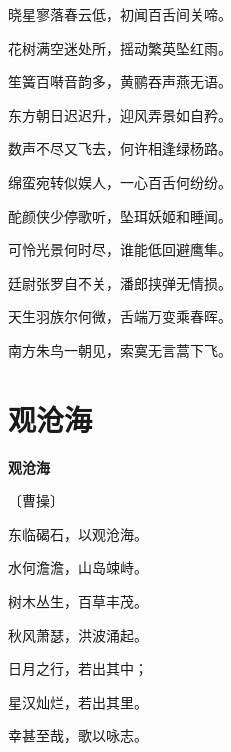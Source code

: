 \documentclass[12pt,UTF-8,openany,fontset=none]{ctexbook}
\begin{document}
\begin{center}
    \begin{Large}

        晓星寥落春云低，初闻百舌间关啼。

        花树满空迷处所，摇动繁英坠红雨。

        笙簧百啭音韵多，黄鹂吞声燕无语。

        东方朝日迟迟升，迎风弄景如自矜。

        数声不尽又飞去，何许相逢绿杨路。

        绵蛮宛转似娱人，一心百舌何纷纷。

        酡颜侠少停歌听，坠珥妖姬和睡闻。

        可怜光景何时尽，谁能低回避鹰隼。

        廷尉张罗自不关，潘郎挟弹无情损。

        天生羽族尔何微，舌端万变乘春晖。

        南方朱鸟一朝见，索寞无言蒿下飞。

    \end{Large}

\end{center}

\vspace{8pt}
\clearpage

\section{观沧海}


\begin{center}
    {\bfseries 观沧海}

    \vspace{18pt}

    \begin{large}\xuwen
        〔曹操〕
    \end{large}

\end{center}

    \vspace{18pt}  %

\begin{center}
    \begin{Large}

        东临碣石，以观沧海。

        水何澹澹，山岛竦峙。

        树木丛生，百草丰茂。

        秋风萧瑟，洪波涌起。

        日月之行，若出其中；

        星汉灿烂，若出其里。

        幸甚至哉，歌以咏志。

    \end{Large}

\end{center}
\end{document}
